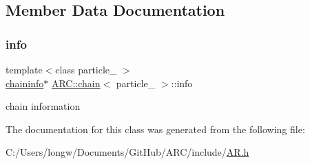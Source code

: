 \subsection{Member Data Documentation}
\hypertarget{classARC_1_1chain_a2b0336aa1235e52e0bb586ba4bcaa211}{}\label{classARC_1_1chain_a2b0336aa1235e52e0bb586ba4bcaa211} 
\subsubsection{\texorpdfstring{info}{info}}
{\footnotesize\ttfamily template$<$class particle\+\_\+ $>$ \\
\hyperlink{classARC_1_1chaininfo}{chaininfo}$\ast$ \hyperlink{classARC_1_1chain}{A\+R\+C\+::chain}$<$ particle\+\_\+ $>$\+::info}



chain information 



The documentation for this class was generated from the following file\+:\begin{DoxyCompactItemize}
\item 
C\+:/\+Users/longw/\+Documents/\+Git\+Hub/\+A\+R\+C/include/\hyperlink{AR_8h}{A\+R.\+h}\end{DoxyCompactItemize}
